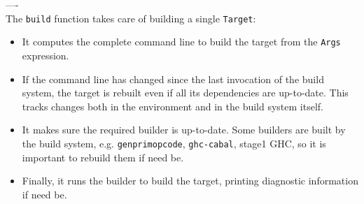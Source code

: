 \noindent ----\\
\noindent The \texttt{build} function takes care of building a single
\texttt{Target}:
\begin{itemize}
  \item It computes the complete command line to build the target from the
  \texttt{Args} expression.
  \item If the command line has changed since the last invocation of the build
  system, the target is rebuilt even if all its dependencies are up-to-date.
  This tracks changes both in the environment and in the build system itself.
  \item It makes sure the required builder is up-to-date. Some builders are
  built by the build system, e.g. \texttt{genprimopcode}, \texttt{ghc-cabal},
  stage1 GHC, so it is important to rebuild them if need be.
  \item Finally, it runs the builder to build the target, printing diagnostic
  information if need be.
\end{itemize}
